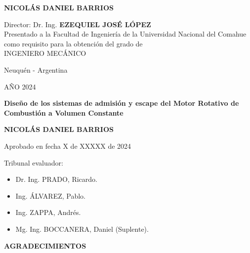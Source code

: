 \documentclass[oneside,a4paper,spanish,links,11pt]{book}
\begin{document}
\begin{center}
\vspace{4cm}

\large{\textbf{
NICOLÁS DANIEL BARRIOS\\
}}

\vspace{4cm}
Director: Dr. Ing. \textbf{EZEQUIEL JOSÉ LÓPEZ}\\


\vspace{3cm}
Presentado a la Facultad de Ingeniería de la Universidad Nacional del Comahue como requisito para la obtención del grado de \\ INGENIERO MECÁNICO

\vfill
Neuquén - Argentina

AÑO 2024

\newpage
\thispagestyle{plain}

\Large\textbf{{Diseño de los sistemas de admisión y escape del Motor Rotativo de Combustión a Volumen Constante \\}}


\vspace{3cm}

\large{\textbf{
NICOLÁS DANIEL BARRIOS
}}\\
\vspace{3cm}
\end{center}

Aprobado en fecha X de XXXXX de 2024


\vspace{2cm}

Tribunal evaluador:

\begin{itemize}

\item Dr. Ing. PRADO, Ricardo. %
\item Ing. ÁLVAREZ, Pablo. %
\item Ing. ZAPPA, Andrés. %
\item Mg. Ing. BOCCANERA, Daniel (Suplente). %

\end{itemize}

\newpage
\thispagestyle{plain}

\begin{center}

\textbf{AGRADECIMIENTOS}\\
\vspace{1cm}

\end{center}
\end{document}
